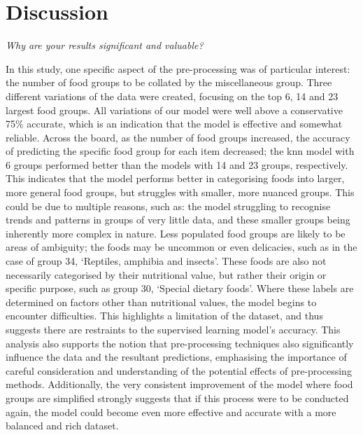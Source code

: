 \documentclass[11pt]{article}
\begin{document}
\section{Discussion}
\emph{Why are your results significant and valuable?}

In this study, one specific aspect of the pre-processing was of particular interest: the number of food groups to be collated by the miscellaneous group. Three different variations of the data were created, focusing on the top 6, 14 and 23 largest food groups. All variations of our model were well above a conservative 75\% accurate, which is an indication that the model is effective and somewhat reliable.
Across the board, as the number of food groups increased, the accuracy of predicting the specific food group for each item decreased; the knn model with 6 groups performed better than the models with 14 and 23 groups, respectively. This indicates that the model performs better in categorising foods into larger, more general food groups, but struggles with smaller, more nuanced groups. This could be due to multiple reasons, such as: the model struggling to recognise trends and patterns in groups of very little data, and these smaller groups being inherently more complex in nature. Less populated food groups are likely to be areas of ambiguity; the foods may be uncommon or even delicacies, such as in the case of group 34, ‘Reptiles, amphibia and insects’. These foods are also not necessarily categorised by their nutritional value, but rather their origin or specific purpose, such as group 30, ‘Special dietary foods’. Where these labels are determined on factors other than nutritional values, the model begins to encounter difficulties.
This highlights a limitation of the dataset, and thus suggests there are restraints to the supervised learning model’s accuracy. This analysis also supports the notion that pre-processing techniques also significantly influence the data and the resultant predictions, emphasising the importance of careful consideration and understanding of the potential effects of pre-processing methods. Additionally, the very consistent improvement of the model where food groups are simplified strongly suggests that if this process were to be conducted again, the model could become even more effective and accurate with a more balanced and rich dataset.
\end{document}
